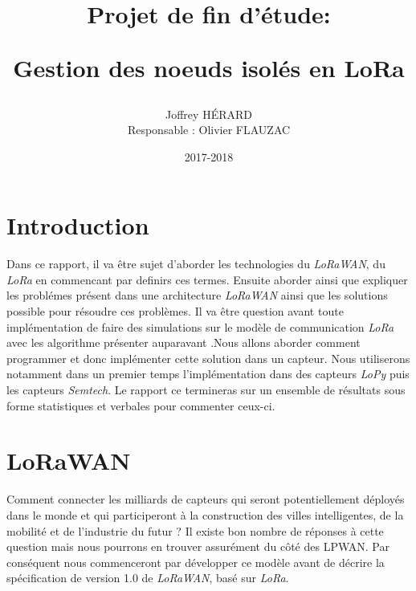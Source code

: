 \documentclass[11pt]{article}
\begin{document}
 \makeatletter
\def\maketitle{%
  \null
  \thispagestyle{empty}%
   \vfill
  \begin{center}\leavevmode
    \normalfont
    {\Huge \@title\par}%
    \vskip 3cm
    {\Large \@author\par}%
    \vskip 1cm
    {\Large \@date\par}%
  \end{center}%
  \vfill
  \null
  \cleardoublepage
  }
\makeatother
\title{\begin{center}Projet de fin d'étude:\end{center} Gestion des noeuds isolés en LoRa }
\author{ Joffrey HÉRARD 
\begin{center}Responsable : Olivier FLAUZAC\end{center}}
\date{2017-2018}
\maketitle 
 
\tableofcontents 

\setlength{\parskip}{0.5em}
\newpage
\section{Introduction}
Dans ce rapport, il va être sujet d'aborder les technologies du \textit{LoRaWAN}, du \textit{LoRa} en commencant par definirs ces termes. Ensuite aborder ainsi que expliquer les problémes présent dans une architecture \textit{LoRaWAN} ainsi que les solutions possible pour résoudre ces problèmes. Il va être question avant toute implémentation de faire des simulations sur le modèle de communication \textit{LoRa} avec les algorithme présenter auparavant .Nous allons aborder comment programmer et donc implémenter cette solution dans un capteur. Nous utiliserons notamment dans un premier temps l'implémentation dans des capteurs \textit{LoPy} puis les capteurs \textit{Semtech}. Le rapport ce termineras sur un ensemble de résultats sous forme statistiques et verbales pour commenter ceux-ci.  
\newpage
\section{LoRaWAN}
Comment connecter les milliards de capteurs qui seront potentiellement déployés dans le monde et qui participeront à la construction des villes intelligentes, de la mobilité et de l'industrie du futur ? \newline
Il existe bon nombre de réponses à cette question mais nous pourrons en trouver assurément du côté des LPWAN. Par conséquent nous commenceront par développer ce modèle avant de décrire la spécification de version 1.0 de  \textit{LoRaWAN}, basé sur \textit{LoRa}.
\end{document}

